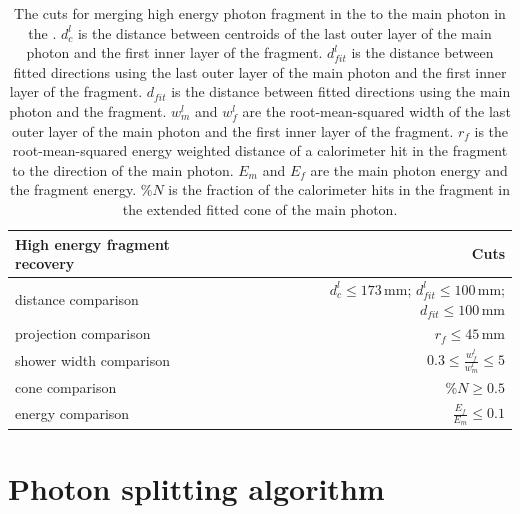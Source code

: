 \begin{table}[htbp]
\centering

\smallskip

\begin{tabular}{l r }
\hline
\hline
High energy fragment recovery&  Cuts\\
\hline
\multicolumn{1}{L{0.3\textwidth}}{distance comparison} & \multicolumn{1}{R{0.6\textwidth}}{$d^l_c \leqslant 173\,\text{mm}$; $d^l_{fit} \leqslant 100\,\text{mm}$; $d_{fit} \leqslant 100\,\text{mm}$} \\
\multicolumn{1}{L{0.3\textwidth}}{projection comparison} & \multicolumn{1}{R{0.6\textwidth}}{$ r_f \leqslant 45\,\text{mm}$} \\
\multicolumn{1}{L{0.3\textwidth}}{shower width comparison} & \multicolumn{1}{R{0.6\textwidth}}{$  0.3 \leqslant \frac{w^l_f}{w^l_m} \leqslant 5$} \\
\multicolumn{1}{L{0.3\textwidth}}{cone comparison} & \multicolumn{1}{R{0.6\textwidth}}{$ \%{N} \geqslant 0.5$} \\
\multicolumn{1}{L{0.3\textwidth}}{energy comparison} & \multicolumn{1}{R{0.6\textwidth}}{$ \frac{E_f}{E_m} \leqslant 0.1$} \\
\hline
\hline
\end{tabular}

\caption[Cuts for merging high energy photon fragment in the \HCAL.]%
{The cuts for merging high energy photon fragment in the \HCAL to the main photon in the \ECAL. $d^l_c$ is the distance between centroids of the last outer layer of the main photon and the first inner layer of the fragment. $d^l_{fit}$ is the distance between fitted directions using the last outer layer of the main photon and the first inner layer of the fragment. $d_{fit}$ is the distance between fitted directions using the main photon and the fragment. $w^l_m$ and $w^l_f$ are the  root-mean-squared width of the last outer layer of the main photon and the first inner layer of the fragment. $r_f$ is the root-mean-squared energy weighted distance of a calorimeter hit in the fragment to the direction of the main photon. $E_m$ and $E_f$ are the main photon energy and the fragment energy. $\%{N}$ is the fraction of the calorimeter hits in the fragment in the extended fitted cone of the main photon.}
\label{tab:photonHighEnergyFragCuts}
\end{table}

\section{Photon splitting algorithm}
\label{sec:photonSplitting}

